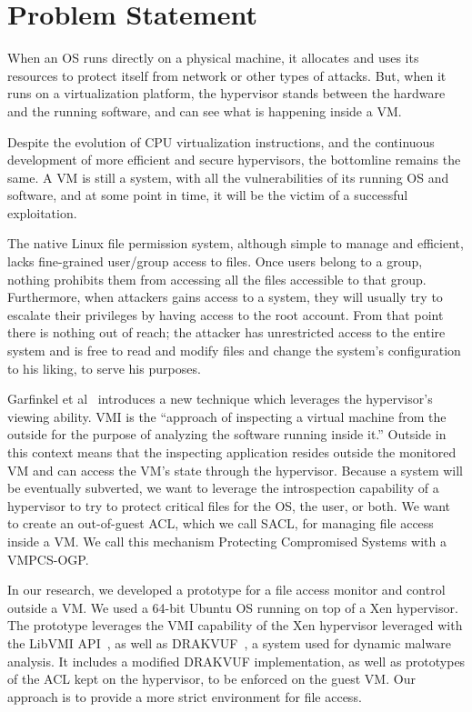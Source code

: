 \section{Problem Statement}\label{sec:problem} 
When an \ac{OS} runs directly on a physical machine, it allocates and uses its resources to protect itself from network or other types of attacks. But, when it runs on a virtualization platform, the hypervisor stands between the hardware and the running software, and can see what is happening inside a \ac{VM}. 

\par Despite the evolution of \ac{CPU} virtualization instructions, and the continuous development of more efficient and secure hypervisors, the bottomline remains the same. A \ac{VM} is still a system, with all the vulnerabilities of its running \ac{OS} and software, and at some point in time, it will be the victim of a successful exploitation. 

\par The native Linux file permission system, although simple to manage and efficient, lacks fine-grained user/group access to files. Once users belong to a group, nothing prohibits them from accessing all the files accessible to that group. Furthermore, when attackers gains access to a system, they will usually try to escalate their privileges by having access to the root account. From that point there is nothing out of reach; the attacker has unrestricted access to the entire system and is free to read and modify files and change the system's configuration to his liking, to serve his purposes.

\par Garfinkel et al~\cite{garfinkel2003virtual} introduces a new technique which leverages the hypervisor's viewing ability. \ac{VMI} is the “approach of inspecting a virtual machine from the outside for the purpose of analyzing the software running inside it.” Outside in this context means that the inspecting application resides outside the monitored \ac{VM} and can access the \ac{VM}'s state through the hypervisor. Because a system will be eventually subverted, we want to leverage the introspection capability of a hypervisor to try to protect critical files for the OS, the user, or both. We want to create an out-of-guest \ac{ACL}, which we call \ac{SACL}, for managing file access inside a VM. We call this mechanism Protecting Compromised Systems with a \ac{VMPCS-OGP}.

\par In our research, we developed a prototype for a file access monitor and control outside a \ac{VM}. We used a 64-bit Ubuntu OS running on top of a Xen hypervisor. The prototype leverages the \ac{VMI} capability of the Xen hypervisor leveraged with the LibVMI \ac{API}~\cite{payne2011libvmi}, as well as DRAKVUF~\cite{lengyel2014drakvuf}, a system used for dynamic malware analysis. It includes a modified DRAKVUF implementation, as well as prototypes of the \ac{ACL} kept on the hypervisor, to be enforced on the guest \ac{VM}. Our approach is to provide a more strict environment for file access.


